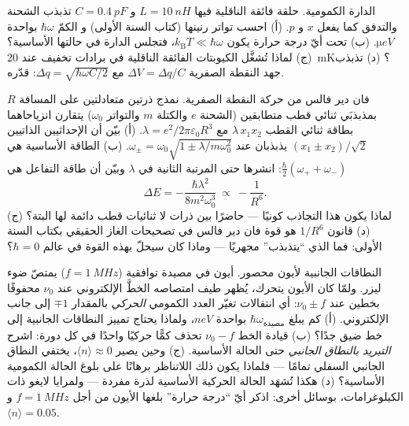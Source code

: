 \begin{exercise}[$\star\star$]\label{exo:b3:harmonic-oscillator:9}
الدارة الكمومية. حلقة فائقة الناقلية فيها $L =
\qty{10}{nH}$ و $C = \qty{0.4}{pF}$ تذبذب الشحنة والتدفق
كما يفعل $x$ و $p$. (أ) احسب تواتر رنينها (كتاب السنة الأولى) و
الكمّ $\hbar\omega$ بواحدة $\unit{\micro eV}$. (ب) تحت أيّ
درجة حرارة يكون $k_{\text{B}}T \ll \hbar\omega$، فتجلس الدارة
في حالتها الأساسية؟ (ج) لماذا تُشغَّل الكيوبتات الفائقة الناقلية في
برادات تخفيف عند \qty{20}{mK}؟ (د) تذبذب جهد النقطة الصفرية
$\Delta V = \Delta q/C$ مع $\Delta q =
\sqrt{\hbar\omega C/2}$: قدّره.
\end{exercise}

\begin{exercise}[$\star\star\star$]\label{exo:b3:harmonic-oscillator:10}
فان دير فالس من حركة النقطة الصفرية. نمذج ذرتين متعادلتين على
المسافة $R$ بمذبذبَي ثنائي قطب متطابقين (الشحنة $e$ والكتلة
$m$ والتواتر $\omega_0$) يتقارن انزياحاهما بطاقة ثنائي
القطب $\lambda\,x_1x_2$ مع $\lambda = e^2/2\pi\varepsilon_0R^3$.
(أ) بيّن أن الإحداثيين الذاتيين $(x_1 \pm x_2)/\sqrt2$ يذبذبان عند
$\omega_\pm = \omega_0\sqrt{1 \pm \lambda/m\omega_0^2}$. (ب) الطاقة
الأساسية هي $\tfrac\hbar2(\omega_+ + \omega_-)$: انشرها حتى
المرتبة الثانية في $\lambda$ وبيّن أن طاقة التفاعل هي
\[
\Delta E = -\frac{\hbar\lambda^2}{8m^2\omega_0^3}
\ \propto\ -\frac{1}{R^6} .
\]
(ج) لماذا يكون هذا التجاذب كونيًا --- حاضرًا بين ذرات
لا ثنائيات قطب دائمة لها البتة؟ (د) قانون $1/R^6$ هو قوة فان
دير فالس في تصحيحات الغاز الحقيقي بكتاب السنة الأولى: فما الذي
``يتذبذب'' مجهريًا --- وماذا كان سيحلّ بهذه القوة
في عالم $\hbar = 0$؟
\end{exercise}

\begin{exercise}[$\star\star\star$]\label{exo:b3:harmonic-oscillator:11}
النطاقات الجانبية لأيون محصور. أيون في مصيدة توافقية ($f =
\qty{1}{MHz}$) يمتصّ ضوء ليزر. ولمّا كان الأيون يتحرك، يُظهر
طيف امتصاصه الخطَّ الإلكتروني عند $\nu_0$ محفوفًا
بخطين عند $\nu_0 \pm f$: أي انتقالات تغيّر العدد الكمومي
\emph{الحركي} بالمقدار $\mp1$ إلى جانب الإلكتروني. (أ) كم يبلغ
$\hbar\omega_{\text{مصيدة}}$ بواحدة $\unit{neV}$، ولماذا يحتاج تمييز
النطاقات الجانبية إلى خط ضيق جدًا؟ (ب) قيادة الخط $\nu_0 - f$
تحذف كمًّا حركيًا واحدًا في كل دورة: اشرح \emph{التبريد
بالنطاق الجانبي} حتى الحالة الأساسية. (ج) وحين يصير $\langle n\rangle \approx
0$، يختفي النطاق الجانبي السفلي تمامًا --- فلماذا يكون ذلك
اللاتناظر برهانًا على بلوغ الحالة الكمومية الأساسية؟ (د) هكذا
تُشهَد الحالة الحركية الأساسية لذرة مفردة --- ولمرايا لايغو
ذات الكيلوغرامات، بوسائل أخرى: اذكر أيّ ``درجة حرارة'' بلغها
الأيون من أجل $f = \qty{1}{MHz}$ و
$\langle n\rangle = 0.05$.
\end{exercise}

